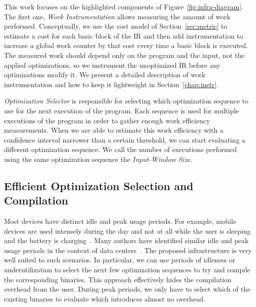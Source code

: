 This work focuses on the highlighted components of Figure~\ref{fig:infra-diagram}. The first one, \textit{Work Instrumentation} allows
measuring the amount of work performed. Conceptually, we use the cost model of Section~\ref{sec:metric} to estimate a cost for each basic
block of the IR and then add instrumentation to increase a global work counter by that cost every time a basic block is executed. The
measured work should depend only on the program and the input, not the applied optimizations, so we instrument the unoptimized IR before
any optimizations modify it. We present a detailed description of work instrumentation and how to keep it lightweight in
Section~\ref{chap:instr}.

\textit{Optimization Selector} is responsible for selecting which optimization sequence to use for the next execution of the program. Each
sequence is used for multiple executions of the program in order to gather enough work efficiency measurements. When we are able to
estimate this work efficiency with a confidence interval narrower than a certain threshold, we can start evaluating a different
optimization sequence. We call the number of executions performed using the same optimization sequence the \textit{Input-Window Size}.


\subsection{Efficient Optimization Selection and Compilation}

Most devices have distinct idle and peak usage periods. For example, mobile devices are used intensely during the day and not at all while
the user is sleeping and the battery is charging~\citep{mpeis16}. Many authors have identified similar idle and peak usage periods in the
context of data centers~\citep{armbrust10,chen12b}. The proposed \itercomp infrastructure is very well suited to such scenarios. In
particular, we can use periods of idleness or underutilization to select the next few optimization sequences to try and compile the
corresponding binaries. This approach effectively hides the compilation overhead from the user. During peak periods, we only have to select
which of the existing binaries to evaluate which introduces almost no overhead.

